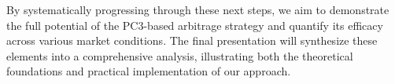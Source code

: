 \documentclass[12pt]{article}
\begin{document}
By systematically progressing through these next steps, we aim to demonstrate the full potential of the PC3-based arbitrage strategy and quantify its efficacy across various market conditions. The final presentation will synthesize these elements into a comprehensive analysis, illustrating both the theoretical foundations and practical implementation of our approach.
\end{document}
